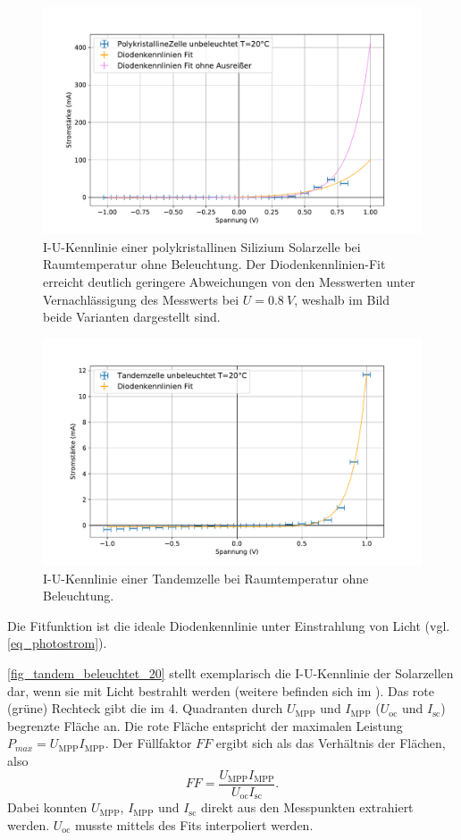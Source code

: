 \documentclass[
	a4paper,
	12pt,
	pagesize,
	ngerman
]{scrartcl}
\begin{document}
	\begin{figure}[H]
			\includegraphics[width=.9\linewidth]{img/PolykristallineZelle_unbeleuchtet_20.pdf}
			\caption{
				I-U-Kennlinie einer polykristallinen Silizium Solarzelle bei Raumtemperatur ohne Beleuchtung.
				Der Diodenkennlinien-Fit erreicht deutlich geringere Abweichungen von den Messwerten unter Vernachlässigung des Messwerts bei $U=\SI{0.8}{V}$, weshalb im Bild beide Varianten dargestellt sind.
								}
			\label{fig_poly_unbeleuchtet_20}
	\end{figure}

	\begin{figure}[H]
			\includegraphics[width=.9\linewidth]{img/Tandemzelle_unbeleuchtet_20.pdf}
			\caption{
				I-U-Kennlinie einer Tandemzelle bei Raumtemperatur ohne Beleuchtung.
								}
			\label{fig_tandem_unbeleuchtet_20}
	\end{figure}

	Die Fitfunktion ist die ideale Diodenkennlinie unter Einstrahlung von Licht (vgl. \cref{eq_photostrom}).

	\cref{fig_tandem_beleuchtet_20} stellt exemplarisch die I-U-Kennlinie der Solarzellen dar, wenn sie mit Licht bestrahlt werden (weitere befinden sich im ).
	Das rote (grüne) Rechteck gibt die im 4. Quadranten durch $U_\text{MPP}$ und $I_\text{MPP}$ ($U_\text{oc}$ und $I_\text{sc}$) begrenzte Fläche an.
	Die rote Fläche entspricht der maximalen Leistung $P_{max} = U_\text{MPP}I_\text{MPP}$.
	Der Füllfaktor $FF$ ergibt sich als das Verhältnis der Flächen, also
	\begin{equation}
		FF = \frac{U_\text{MPP}I_\text{MPP}}{U_\text{oc}I_\text{sc}}.
	\end{equation}
	Dabei konnten $U_\text{MPP}$, $I_\text{MPP}$ und $I_\text{sc}$ direkt aus den Messpunkten extrahiert werden.
	$U_\text{oc}$ musste mittels des Fits interpoliert werden.
\end{document}
